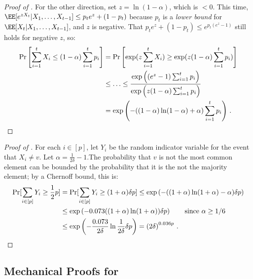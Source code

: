 \begin{proof}[Proof of ]
  For the other direction, set $z = \ln(1-\alpha)$, which is $< 0$.
  This time, $\EE[e^{z X_t} | X_1,\ldots,X_{t-1}] \le p_t e^z + (1-p_t)$ because $p_t$ is a \emph{lower bound} for $\EE[X_t | X_1,\ldots,X_{t-1}]$, and $z$ is negative. That $p_t e^z + (1-p_t) \le e^{p_t (e^z - 1)}$ still holds for negative $z$, so:
  \begin{align*}
    \Pr\left[ \sum_{i=1}^{t} X_i \le (1 - \alpha) \sum_{i =1}^{t} p_i \right] &= \Pr\left[ \exp(z\sum_{i=1}^{t} X_i) \ge \exp(z (1 - \alpha) \sum_{i =1}^{t} p_i) \right] \\
      &\le \ldots \le \frac{\exp\left((e^z - 1)\sum_{i=1}^{t} p_i\right)}{\exp\left(z (1 - \alpha) \sum_{i =1}^{t} p_i\right)} \\
      &= \exp\left(- ((1-\alpha) \ln (1-\alpha) + \alpha) \sum_{i =1}^{t} p_i\right) \,. \qedhere
  \end{align*}
\end{proof}

\begin{proof}[Proof of ]
  For each $i \in [p]$, let $Y_i$ be the random indicator variable for the event that $X_i \ne v$. Let $\alpha = \frac{1}{2 \delta} - 1$.The probability that $v$ is not the most common element can be bounded by the probability that it is the not the majority element; by a Chernoff bound, this is:
  \begin{align*}
    \Pr[\sum_{i\in[p]} Y_i \ge \frac{1}{2} p] &= \Pr[\sum_{i\in[p]} Y_i \ge (1 + \alpha) \delta p] \le \exp\left( - ((1+\alpha) \ln(1+\alpha) - \alpha) \delta p\right) \\
      &\le \exp\left( - 0.073 ((1+\alpha) \ln(1+\alpha) ) \delta p\right) \qquad \text{since $\alpha \ge 1/6$} \\
      &\le \exp\left( - \frac{0.073 }{2\delta} \ln\frac{1}{2\delta} \delta p\right) = \left(2\delta\right)^{0.036 p} \,. \qedhere
  \end{align*}
\end{proof}


\subsection{Mechanical Proofs for \texorpdfstring{}{Random Tape Lower Bound}}\label{subsec:rt-lb-mech}

